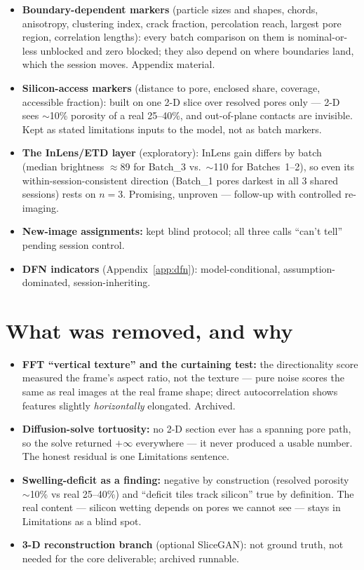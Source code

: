 \documentclass[10pt,a4paper]{article}
\begin{document}
\begin{itemize}
\item \textbf{Boundary-dependent markers} (particle sizes and shapes,
chords, anisotropy, clustering index, crack fraction, percolation reach,
largest pore region, correlation lengths): every batch comparison on them
is nominal-or-less unblocked and zero blocked; they also depend on where
boundaries land, which the session moves. Appendix material.
\item \textbf{Silicon-access markers} (distance to pore, enclosed share,
coverage, accessible fraction): built on one 2-D slice over resolved
pores only --- 2-D sees $\sim$10\% porosity of a real 25--40\%, and
out-of-plane contacts are invisible. Kept as stated limitations inputs
to the model, not as batch markers.
\item \textbf{The InLens/ETD layer} (exploratory): InLens gain differs
by batch (median brightness $\approx$89 for Batch\_3 vs.\ $\sim$110 for
Batches~1--2), so even its within-session-consistent direction
(Batch\_1 pores darkest in all 3 shared sessions) rests on $n=3$.
Promising, unproven --- follow-up with controlled re-imaging.
\item \textbf{New-image assignments:} kept blind protocol; all three
calls ``can't tell'' pending session control.
\item \textbf{DFN indicators} (Appendix~\ref{app:dfn}): model-conditional,
assumption-dominated, session-inheriting.
\end{itemize}

\section{What was removed, and why}
\label{sec:removed}

\begin{itemize}
\item \textbf{FFT ``vertical texture'' and the curtaining test:} the
directionality score measured the frame's aspect ratio, not the texture
--- pure noise scores the same as real images at the real frame shape;
direct autocorrelation shows features slightly \emph{horizontally}
elongated. Archived.
\item \textbf{Diffusion-solve tortuosity:} no 2-D section ever has a
spanning pore path, so the solve returned $+\infty$ everywhere --- it
never produced a usable number. The honest residual is one Limitations
sentence.
\item \textbf{Swelling-deficit as a finding:} negative by construction
(resolved porosity $\sim$10\% vs real 25--40\%) and ``deficit tiles
track silicon'' true by definition. The real content --- silicon wetting
depends on pores we cannot see --- stays in Limitations as a blind spot.
\item \textbf{3-D reconstruction branch} (optional SliceGAN): not ground
truth, not needed for the core deliverable; archived runnable.
\end{itemize}
\end{document}
